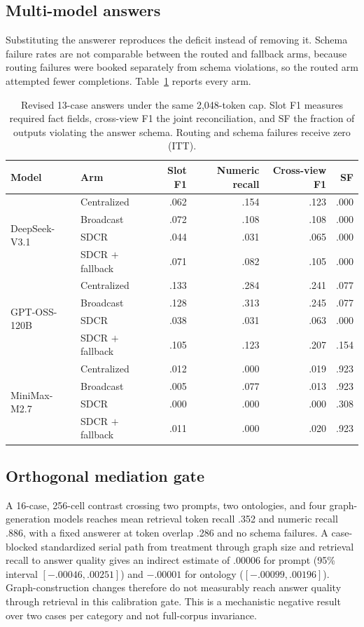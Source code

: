 \subsection{Multi-model answers}
Substituting the answerer reproduces the deficit instead of removing it. Schema
failure rates are not comparable between the routed and fallback arms, because
routing failures were booked separately from schema violations, so the routed arm
attempted fewer completions. Table~\ref{tab:answers-ea} reports every arm.

\begin{table}[t]
\centering
\caption{Revised 13-case answers under the same 2,048-token cap. Slot F1 measures required fact fields, cross-view F1 the joint reconciliation, and SF the fraction of outputs violating the answer schema. Routing and schema failures receive zero (ITT).}
\label{tab:answers-ea}
\small
\begin{tabular}{llrrrr}
\toprule
Model & Arm & Slot F1 & Numeric recall & Cross-view F1 & SF\\
\midrule
\multirow{4}{*}{DeepSeek-V3.1} & Centralized & .062 & .154 & .123 & .000\\
 & Broadcast & .072 & .108 & .108 & .000\\
 & SDCR & .044 & .031 & .065 & .000\\
 & SDCR $+$ fallback & .071 & .082 & .105 & .000\\
\midrule
\multirow{4}{*}{GPT-OSS-120B} & Centralized & .133 & .284 & .241 & .077\\
 & Broadcast & .128 & .313 & .245 & .077\\
 & SDCR & .038 & .031 & .063 & .000\\
 & SDCR $+$ fallback & .105 & .123 & .207 & .154\\
\midrule
\multirow{4}{*}{MiniMax-M2.7} & Centralized & .012 & .000 & .019 & .923\\
 & Broadcast & .005 & .077 & .013 & .923\\
 & SDCR & .000 & .000 & .000 & .308\\
 & SDCR $+$ fallback & .011 & .000 & .020 & .923\\
\bottomrule
\end{tabular}
\end{table}

\subsection{Orthogonal mediation gate}
A 16-case, 256-cell contrast crossing two prompts, two ontologies, and four
graph-generation models reaches mean retrieval token recall .352 and numeric
recall .886, with a fixed answerer at token overlap .286 and no schema failures.
A case-blocked standardized serial path from treatment through graph size and
retrieval recall to answer quality gives an indirect estimate of $.00006$ for
prompt (95\% interval $[-.00046,.00251]$) and $-.00001$ for ontology
($[-.00099,.00196]$). Graph-construction changes therefore do not measurably
reach answer quality through retrieval in this calibration gate. This is a
mechanistic negative result over two cases per category and not full-corpus
invariance.

